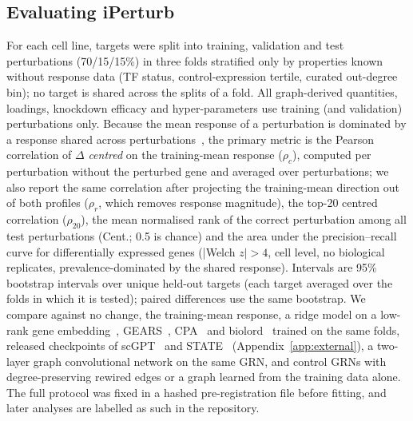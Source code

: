 \subsection{Evaluating iPerturb}
\label{sec:eval}
For each cell line, targets were split into training, validation and test perturbations (70/15/15\%) in three folds stratified only by properties known without response data (TF status, control-expression tertile, curated out-degree bin); no target is shared across the splits of a fold. All graph-derived quantities, loadings, knockdown efficacy and hyper-parameters use training (and validation) perturbations only.
Because the mean response of a perturbation is dominated by a response shared across perturbations~\cite{vinas2025systema}, the primary metric is the Pearson correlation of $\Delta$ \emph{centred} on the training-mean response ($\rho_c$), computed per perturbation without the perturbed gene and averaged over perturbations; we also report the same correlation after projecting the training-mean direction out of both profiles ($\rho_r$, which removes response magnitude), the top-20 centred correlation ($\rho_{20}$), the mean normalised rank of the correct perturbation among all test perturbations (Cent.; 0.5 is chance) and the area under the precision--recall curve for differentially expressed genes (|Welch $z|>4$, cell level, no biological replicates, prevalence-dominated by the shared response). Intervals are 95\% bootstrap intervals over unique held-out targets (each target averaged over the folds in which it is tested); paired differences use the same bootstrap.
We compare against no change, the training-mean response, a ridge model on a low-rank gene embedding~\cite{ahlmanneltze2025comparison}, GEARS~\cite{roohani2024predicting}, CPA~\cite{lotfollahi2023predicting} and biolord~\cite{piran2024biolord} trained on the same folds, released checkpoints of scGPT~\cite{cui2024scgpt} and STATE~\cite{adduri2025predicting} (Appendix~\ref{app:external}), a two-layer graph convolutional network on the same GRN, and control GRNs with degree-preserving rewired edges or a graph learned from the training data alone. The full protocol was fixed in a hashed pre-registration file before fitting, and later analyses are labelled as such in the repository.
